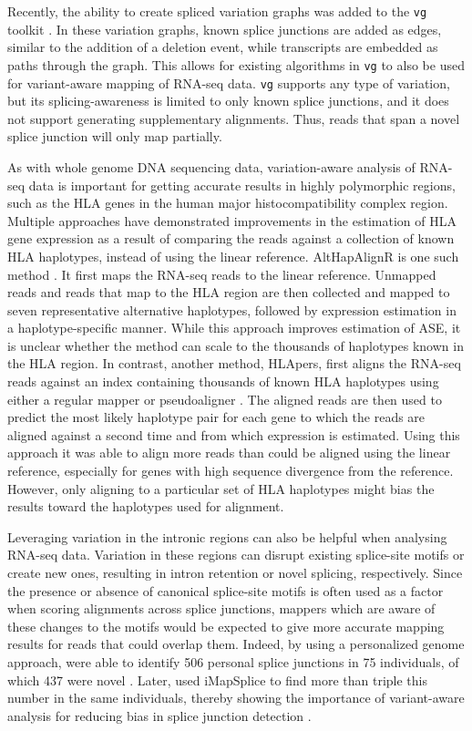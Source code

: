 Recently, the ability to create spliced variation graphs was added to the \texttt{vg} toolkit \cite{Garrison_2018}. 
In these variation graphs, known splice junctions are added as edges, similar to the addition of a deletion event, while transcripts are embedded as paths through the graph. 
This allows for existing algorithms in \texttt{vg} to also be used for variant-aware mapping of RNA-seq data. 
\texttt{vg} supports any type of variation, but its splicing-awareness is limited to only known splice junctions, and it does not support generating supplementary alignments.
Thus, reads that span a novel splice junction will only map partially.

As with whole genome DNA sequencing data, variation-aware analysis of RNA-seq data is important for getting accurate results in highly polymorphic regions, such as the HLA genes in the human major histocompatibility complex region. 
Multiple approaches have demonstrated improvements in the estimation of HLA gene expression as a result of comparing the reads against a collection of known HLA haplotypes, instead of using the linear reference.
AltHapAlignR is one such method \cite{Lee_2018}.
It first maps the RNA-seq reads to the linear reference.
Unmapped reads and reads that map to the HLA region are then collected and mapped to seven representative alternative haplotypes, followed by expression estimation in a haplotype-specific manner. 
While this approach improves estimation of ASE, it is unclear whether the method can scale to the thousands of haplotypes known in the HLA region.
In contrast, another method, HLApers, first aligns the RNA-seq reads against an index containing thousands of known HLA haplotypes using either a regular mapper or pseudoaligner \cite{Aguiar2019-fy}.
The aligned reads are then used to predict the most likely haplotype pair for each gene to which the reads are aligned against a second time and from which expression is estimated.
Using this approach it was able to align more reads than could be aligned using the linear reference, especially for genes with high sequence divergence from the reference.
However, only aligning to a particular set of HLA haplotypes might bias the results toward the haplotypes used for alignment.

Leveraging variation in the intronic regions can also be helpful when analysing RNA-seq data. 
Variation in these regions can disrupt existing splice-site motifs or create new ones, resulting in intron retention or novel splicing, respectively. 
Since the presence or absence of canonical splice-site motifs is often used as a factor when scoring alignments across splice junctions, mappers which are aware of these changes to the motifs would be expected to give more accurate mapping results for reads that could overlap them. 
Indeed, by using a personalized genome approach, \citeauthor{Stein_2015} were able to identify 506 personal splice junctions in 75 individuals, of which 437 were novel \cite{Stein_2015}. 
Later, \citeauthor{Liu_2018} used iMapSplice to find more than triple this number in the same individuals, thereby showing the importance of variant-aware analysis for reducing bias in splice junction detection \cite{Liu_2018}.

